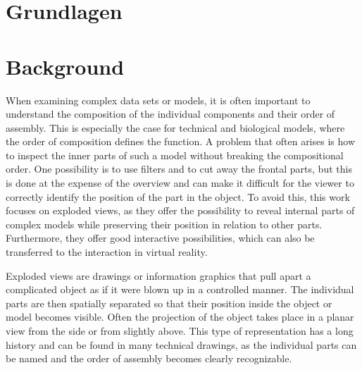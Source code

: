 {\chapter{Grundlagen}}
{\chapter{Background}}
\label{sec:background}





When examining complex data sets or models, it is often important to understand the composition of the individual components and their order of assembly. 
This is especially the case for technical and biological models, where the order of composition defines the function. 
A problem that often arises is how to inspect the inner parts of such a model without breaking the compositional order. 
One possibility is to use filters and to cut away the frontal parts, but this is done at the expense of the overview and can make it difficult for the viewer to correctly identify the position of the part in the object. 
To avoid this, this work focuses on exploded views, as they offer the possibility to reveal internal parts of complex models while preserving their position in relation to other parts. 
Furthermore, they offer good interactive possibilities, which can also be transferred to the interaction in virtual reality.

Exploded views are drawings or information graphics that pull apart a complicated object as if it were blown up in a controlled manner. 
The individual parts are then spatially separated so that their position inside the object or model becomes visible. 
Often the projection of the object takes place in a planar view from the side or from slightly above.
This type of representation has a long history and can be found in many technical drawings, as the individual parts can be named and the order of assembly becomes clearly recognizable. %

